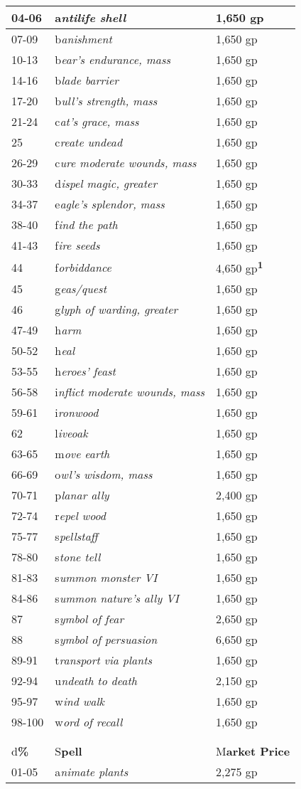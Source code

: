 \documentclass{article}
\begin{document}
\begin{tabular}{|>{\raggedright}p{29pt}|>{\raggedright}p{138pt}|>{\raggedright}p{147pt}|}
\hline
04-06 & a\textit{ntilife shell} & 1,650 gp\tabularnewline
\hline
07-09 & b\textit{anishment} & 1,650 gp\tabularnewline
\hline
10-13 & b\textit{ear's endurance, mass} & 1,650 gp\tabularnewline
\hline
14-16 & b\textit{lade barrier} & 1,650 gp\tabularnewline
\hline
17-20 & b\textit{ull's strength, mass} & 1,650 gp\tabularnewline
\hline
21-24 & c\textit{at's grace, mass} & 1,650 gp\tabularnewline
\hline
25 & c\textit{reate undead} & 1,650 gp\tabularnewline
\hline
26-29 & c\textit{ure moderate wounds, mass} & 1,650 gp\tabularnewline
\hline
30-33 & d\textit{ispel magic, greater} & 1,650 gp\tabularnewline
\hline
34-37 & e\textit{agle's splendor, mass} & 1,650 gp\tabularnewline
\hline
38-40 & f\textit{ind the path} & 1,650 gp\tabularnewline
\hline
41-43 & f\textit{ire seeds} & 1,650 gp\tabularnewline
\hline
44 & f\textit{orbiddance} & 4,650 gp\textsuperscript{\textbf{1}}\tabularnewline
\hline
45 & g\textit{eas/quest} & 1,650 gp\tabularnewline
\hline
46 & g\textit{lyph of warding, greater} & 1,650 gp\tabularnewline
\hline
47-49 & h\textit{arm} & 1,650 gp\tabularnewline
\hline
50-52 & h\textit{eal} & 1,650 gp\tabularnewline
\hline
53-55 & h\textit{eroes' feast} & 1,650 gp\tabularnewline
\hline
56-58 & i\textit{nflict moderate wounds, mass} & 1,650 gp\tabularnewline
\hline
59-61 & i\textit{ronwood} & 1,650 gp\tabularnewline
\hline
62 & l\textit{iveoak} & 1,650 gp\tabularnewline
\hline
63-65 & m\textit{ove earth} & 1,650 gp\tabularnewline
\hline
66-69 & o\textit{wl's wisdom, mass} & 1,650 gp\tabularnewline
\hline
70-71 & p\textit{lanar ally} & 2,400 gp\tabularnewline
\hline
72-74 & r\textit{epel wood} & 1,650 gp\tabularnewline
\hline
75-77 & s\textit{pellstaff} & 1,650 gp\tabularnewline
\hline
78-80 & s\textit{tone tell} & 1,650 gp\tabularnewline
\hline
81-83 & s\textit{ummon monster VI} & 1,650 gp\tabularnewline
\hline
84-86 & s\textit{ummon nature's ally VI} & 1,650 gp\tabularnewline
\hline
87 & s\textit{ymbol of fear} & 2,650 gp\tabularnewline
\hline
88 & s\textit{ymbol of persuasion} & 6,650 gp\tabularnewline
\hline
89-91 & t\textit{ransport via plants} & 1,650 gp\tabularnewline
\hline
92-94 & u\textit{ndeath to death} & 2,150 gp\tabularnewline
\hline
95-97 & w\textit{ind walk} & 1,650 gp\tabularnewline
\hline
98-100 & w\textit{ord of recall} & 1,650 gp\tabularnewline
\hline
\multicolumn{3}{|p{314pt}|}{1 Assumes an area equivalent to one 60-foot cube.}\tabularnewline
\hline
\multicolumn{3}{|p{314pt}|}{7\textit{\textbf{th-Level Divine Spells}}}\tabularnewline
\hline
d\textbf{\%} & S\textbf{pell} & M\textbf{arket Price}\tabularnewline
\hline
01-05 & a\textit{nimate plants} & 2,275 gp\tabularnewline

\end{tabular}
\end{document}
